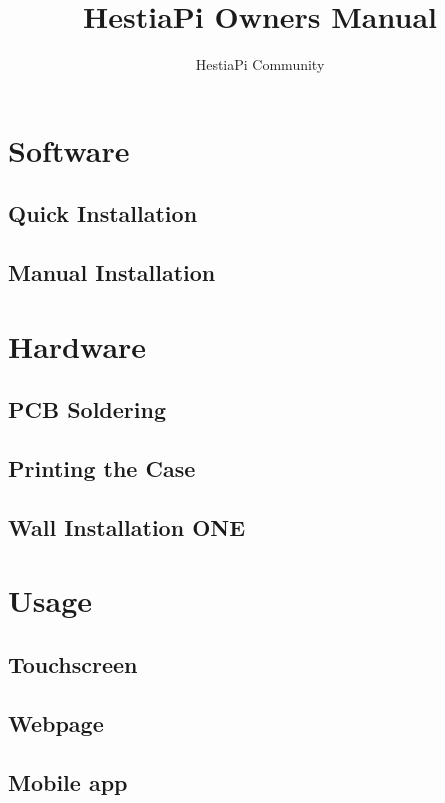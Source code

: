 \documentclass{article}
\begin{document}
\title{HestiaPi Owners Manual}
\author{HestiaPi Community}
\maketitle

\tableofcontents
\newpage

\section{Software}
\subsection{Quick Installation}


\subsection{Manual Installation}



\section{Hardware}
\subsection{PCB Soldering}


\subsection{Printing the Case}


\subsection{Wall Installation ONE}



\section{Usage}
\subsection{Touchscreen} \label{Touchscreen}

\subsection{Webpage} \label{Webpage}

\subsection{Mobile app}

\end{document}
